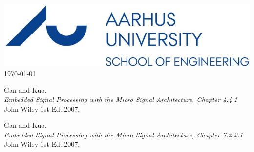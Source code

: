 \documentclass[12pt]{article}
\renewcommand{\refname}{whatever}
\begin{document}
\begin{titlepage}
		
		\includegraphics[scale=0.5]{Img/logo.jpg}\\[1cm]
		
		{\large \today}\\[0.5cm] %
		
		
		\vfill %
		
	\end{titlepage}
	
\newpage
\tableofcontents
\newpage
\listoffigures
\newpage

\hypersetup{linkcolor=blue}














\renewcommand\refname{References}
\begin{thebibliography}{9}
	Gan and Kuo. \\
	\textit{Embedded Signal Processing with the Micro Signal Architecture, Chapter 4.4.1}\\ 
	John Wiley 1st Ed. 2007.
	
	Gan and Kuo. \\
	\textit{Embedded Signal Processing with the Micro Signal Architecture, Chapter 7.2.2.1}\\ 
	John Wiley 1st Ed. 2007.
	
\end{thebibliography}


\end{document}
